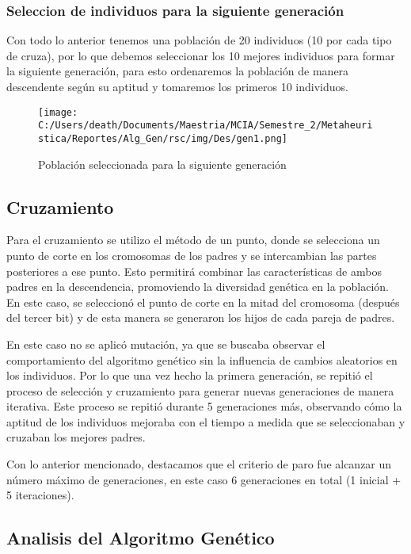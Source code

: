\subsubsection{Seleccion de individuos para la siguiente generación}
Con todo lo anterior tenemos una población de 20 individuos (10 por cada tipo de cruza), por lo que debemos seleccionar los 10 mejores
individuos para formar la siguiente generación, para esto ordenaremos la población de manera descendente según su aptitud y tomaremos 
los primeros 10 individuos.

\begin{figure} [H]
    \centering
    \texttt{[image: C:/Users/death/Documents/Maestria/MCIA/Semestre\_2/Metaheuristica/Reportes/Alg\_Gen/rsc/img/Des/gen1.png]}
    \caption{Población seleccionada para la siguiente generación}\label{Pob_selec}
\end{figure}

\subsection{Cruzamiento}
Para el cruzamiento se utilizo el método de un punto, donde se selecciona un punto de corte en los cromosomas de los padres y se intercambian las partes posteriores a ese punto.
Esto permitirá combinar las características de ambos padres en la descendencia, promoviendo la diversidad genética en la población.
En este caso, se seleccionó el punto de corte en la mitad del cromosoma (después del tercer bit) y de esta manera se generaron los hijos de cada pareja de padres.

En este caso no se aplicó mutación, ya que se buscaba observar el comportamiento del algoritmo genético sin la influencia de cambios aleatorios en los individuos.
Por lo que una vez hecho la primera generación, se repitió el proceso de selección y cruzamiento para generar nuevas generaciones de manera iterativa.
Este proceso se repitió durante 5 generaciones más, observando cómo la aptitud de los individuos mejoraba con el tiempo a medida que se seleccionaban y cruzaban los mejores padres.

Con lo anterior mencionado, destacamos que el criterio de paro fue alcanzar un número máximo de generaciones, en este caso 6 generaciones en total (1 inicial + 5 iteraciones).

\subsection{Analisis del Algoritmo Genético}

